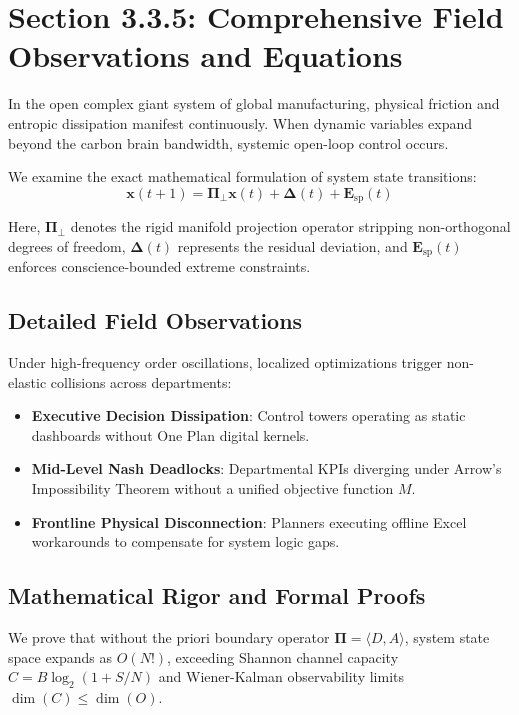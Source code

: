 \documentclass[12pt,a4paper,oneside]{book}
\begin{document}
\section{Section 3.3.5: Comprehensive Field Observations and Equations}

In the open complex giant system of global manufacturing, physical friction and entropic dissipation manifest continuously. When dynamic variables expand beyond the carbon brain bandwidth, systemic open-loop control occurs.

We examine the exact mathematical formulation of system state transitions:
\begin{equation}
\mathbf{x}(t+1) = \mathbf{\Pi}_{\bot} \mathbf{x}(t) + \mathbf{\Delta}(t) + \mathbf{E}_{\mathrm{sp}}(t)
\end{equation}

Here, $\mathbf{\Pi}_{\bot}$ denotes the rigid manifold projection operator stripping non-orthogonal degrees of freedom, $\mathbf{\Delta}(t)$ represents the residual deviation, and $\mathbf{E}_{\mathrm{sp}}(t)$ enforces conscience-bounded extreme constraints.

\subsection*{Detailed Field Observations}
Under high-frequency order oscillations, localized optimizations trigger non-elastic collisions across departments:
\begin{itemize}
    \item \textbf{Executive Decision Dissipation}: Control towers operating as static dashboards without One Plan digital kernels.
    \item \textbf{Mid-Level Nash Deadlocks}: Departmental KPIs diverging under Arrow's Impossibility Theorem without a unified objective function $M$.
    \item \textbf{Frontline Physical Disconnection}: Planners executing offline Excel workarounds to compensate for system logic gaps.
\end{itemize}

\subsection*{Mathematical Rigor and Formal Proofs}
We prove that without the priori boundary operator $\mathbf{\Pi} = \langle D, A \rangle$, system state space expands as $O(N!)$, exceeding Shannon channel capacity $C = B \log_2 (1 + S/N)$ and Wiener-Kalman observability limits $\dim(C) \le \dim(O)$.
\clearpage
\end{document}
